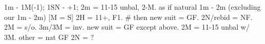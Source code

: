 1m - 1M(-1); 1SN - +1; 
2m = 11-15 unbal, 2-M. as if natural 1m - 2m (excluding our 1m - 2m)
    [M = S] 2H = 11+, F1.  # then new suit = GF. 2N/rebid = NF.
    2M = s/o. 3m/3M = inv. new suit = GF except above.
2M = 11-15 unbal w/ 3M.
other = nat GF 
2N = ?